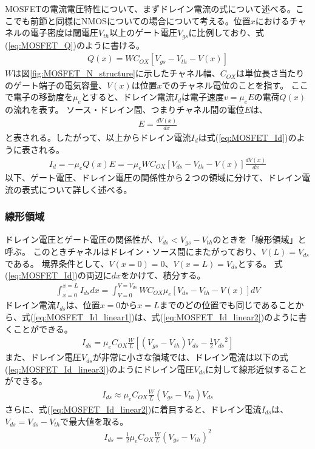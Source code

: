 		MOSFETの電流電圧特性について、まずドレイン電流の式について述べる。ここでも前節と同様にNMOSについての場合について考える。位置$x$におけるチャネルの電子密度は閾電圧$V_{th}$以上のゲート電圧$V_{gs}$に比例しており、式(\ref{eq:MOSFET_Q})のように書ける。
		\begin{eqnarray}
			Q(x) = W C_{OX}[V_{gs} - V_{th} - V(x)]
			\label{eq:MOSFET_Q}
		\end{eqnarray}
		$W$は図\ref{fig:MOSFET_N_structure}に示したチャネル幅、$C_{OX}$は単位長さ当たりのゲート端子の電気容量、$V(x)$は位置$x$でのチャネル電位のことを指す。
		ここで電子の移動度を$\mu_{e}$とすると、ドレイン電流$I_d$は電子速度$v = \mu_{e}E$の電荷$Q(x)$の流れを表す。
		ソース・ドレイン間、つまりチャネル間の電位$E$は、
		\begin{eqnarray}
			E = \frac{dV(x)}{dx}
		\end{eqnarray}
		と表される。したがって、以上からドレイン電流$I_d$は式(\ref{eq:MOSFET_Id})のように表される。
		\begin{eqnarray}
			I_d = - \mu_e Q(x) E = - \mu_e W C_{OX}[V_{ds} - V_{th} - V(x)] \frac{dV(x)}{dx}
			\label{eq:MOSFET_Id}
		\end{eqnarray}
		以下、ゲート電圧、ドレイン電圧の関係性から２つの領域に分けて、ドレイン電流の表式について詳しく述べる。
		\subsubsection{線形領域}
			ドレイン電圧とゲート電圧の関係性が、$V_{ds} < V_{gs} - V_{th}$のときを「線形領域」と呼ぶ。
			このときチャネルはドレイン・ソース間にまたがっており、$V(L)=V_{ds}$である。
			境界条件として、$V(x=0) = 0$、$V(x=L)=V_{ds}$とする。
			式(\ref{eq:MOSFET_Id})の両辺に$dx$をかけて、積分する。
			\begin{eqnarray}
				\int_{x=0}^{x=L} I_{ds} dx = \int_{V=0}^{V=V_{ds}} W C_{OX} \mu_e [V_{ds} - V_{th} - V(x)] dV
				\label{eq:MOSFET_Id_linear1}
			\end{eqnarray}
			ドレイン電流$I_{ds}$は、位置$x=0$から$x=L$までのどの位置でも同じであることから、式(\ref{eq:MOSFET_Id_linear1})は、式(\ref{eq:MOSFET_Id_linear2})のように書くことができる。
			\begin{eqnarray}
				I_{ds} = \mu_e C_{OX} \frac{W}{L}[(V_{gs} - V_{th})V_{ds} - \frac{1}{2} {V_{ds}}^2 ]
				\label{eq:MOSFET_Id_linear2}
			\end{eqnarray}
			また、ドレイン電圧$V_{ds}$が非常に小さな領域では、ドレイン電流は以下の式(\ref{eq:MOSFET_Id_linear3})のようにドレイン電圧$V_{ds}$に対して線形近似することができる。
			\begin{eqnarray}
				I_{ds} \approx \mu_e C_{OX} \frac{W}{L} (V_{gs} - V_{th}) V_{ds}
				\label{eq:MOSFET_Id_linear3}
			\end{eqnarray}
			さらに、式(\ref{eq:MOSFET_Id_linear2})に着目すると、ドレイン電流$I_{ds}$は、$V_{ds} = V_{ds} - V_{th}$で最大値を取る。
			\begin{eqnarray}
				I_{ds} = \frac{1}{2} \mu_e C_{OX} \frac{W}{L} {(V_{gs} - V_{th})}^2
				\label{eq:MOSFET_Id_linear4}
			\end{eqnarray}
		

